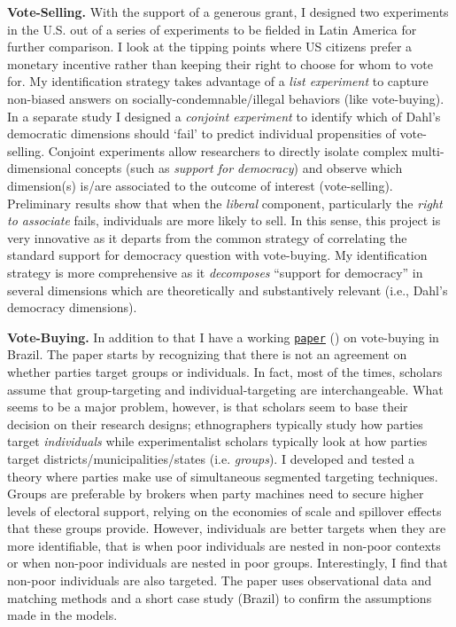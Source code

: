 \documentclass[10pt,stdletter,dateno,sigleft]{newlfm} %
\begin{document}
\begin{newlfm}
{\bf Vote-Selling.} With the support of a generous grant, I designed two experiments in the U.S. out of a series of experiments to be fielded in Latin America for further comparison. I look at the tipping points where US citizens prefer a monetary incentive rather than keeping their right to choose for whom to vote for. My identification strategy takes advantage of a \emph{list experiment} to capture non-biased answers on socially-condemnable/illegal behaviors (like vote-buying). In a separate study I designed a \emph{conjoint experiment} to identify which of Dahl's democratic dimensions should `fail' to predict individual propensities of vote-selling. Conjoint experiments allow researchers to directly isolate complex multi-dimensional concepts (such as \emph{support for democracy}) and observe which dimension(s) is/are associated to the outcome of interest (vote-selling). Preliminary results show that when the \emph{liberal} component, particularly the \emph{right to associate} fails, individuals are more likely to sell. In this sense, this project is very innovative as it departs from the common strategy of correlating the standard support for democracy question with vote-buying. My identification strategy is more comprehensive as it \emph{decomposes} ``support for democracy'' in several dimensions which are theoretically and substantively relevant (i.e., Dahl's democracy dimensions). 

{\bf Vote-Buying.} In addition to that I have a working \href{https://github.com/hbahamonde/Clientelism_paper/raw/master/Bahamonde_Clientelism_Paper.pdf}{\texttt{paper}} (\emph{\unskip}) on vote-buying in Brazil. The paper starts by recognizing that there is not an agreement on whether parties target groups or individuals. In fact, most of the times, scholars assume that group-targeting and individual-targeting are interchangeable. What seems to be a major problem, however, is that scholars seem to base their decision on their research designs; ethnographers typically study how parties target \emph{individuals} while experimentalist scholars typically look at how parties target districts/municipalities/states (i.e. \emph{groups}). I developed and tested a theory where parties make use of simultaneous segmented targeting techniques. Groups are preferable by brokers when party machines need to secure higher levels of electoral support, relying on the economies of scale and spillover effects that these groups provide. However, individuals are better targets when they are more identifiable, that is when poor individuals are nested in non-poor contexts or when non-poor individuals are nested in poor groups. Interestingly, I find that non-poor individuals are also targeted. The paper uses observational data and matching methods and a short case study (Brazil) to confirm the assumptions made in the models.


\end{newlfm}
\end{document}
